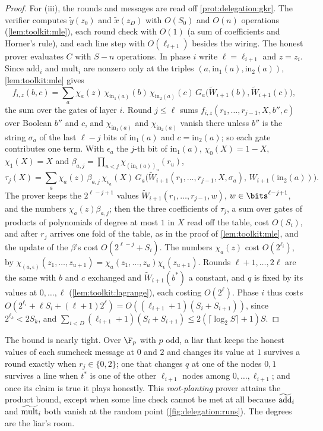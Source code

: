 \begin{refsection}
\begin{proof}
For (iii), the rounds and messages are read off \cref{prot:delegation:gkr}. The verifier computes $\tilde y(z_0)$ and $\tilde x(z_D)$ with $O(S_0)$ and $O(n)$ operations (\cref{lem:toolkit:mle}), each round check with $O(1)$ (a sum of coefficients and Horner's rule), and each line step with $O(\ell_{i+1})$ besides the wiring. The honest prover evaluates $C$ with $S-n$ operations. In phase $i$ write $\ell=\ell_{i+1}$ and $z=z_i$. Since $\mathrm{add}_i$ and $\mathrm{mult}_i$ are nonzero only at the triples $(a,\mathrm{in}_1(a),\mathrm{in}_2(a))$, \cref{lem:toolkit:mle} gives
\[
f_{i,z}(b,c)=\sum_a\chi_a(z)\,\chi_{\mathrm{in}_1(a)}(b)\,\chi_{\mathrm{in}_2(a)}(c)\,G_a\bigl(\tilde W_{i+1}(b),\tilde W_{i+1}(c)\bigr),
\]
the sum over the gates of layer $i$. Round $j\le\ell$ sums $f_{i,z}(r_1,\dots,r_{j-1},X,b'',c)$ over Boolean $b''$ and $c$, and $\chi_{\mathrm{in}_1(a)}$ and $\chi_{\mathrm{in}_2(a)}$ vanish there unless $b''$ is the string $\sigma_a$ of the last $\ell-j$ bits of $\mathrm{in}_1(a)$ and $c=\mathrm{in}_2(a)$; so each gate contributes one term. With $\epsilon_a$ the $j$-th bit of $\mathrm{in}_1(a)$, $\chi_0(X)=1-X$, $\chi_1(X)=X$ and $\beta_{a,j}=\prod_{u<j}\chi_{(\mathrm{in}_1(a))_u}(r_u)$,
\[
\tau_j(X)=\sum_a\chi_a(z)\,\beta_{a,j}\,\chi_{\epsilon_a}(X)\,G_a\bigl(\tilde W_{i+1}(r_1,\dots,r_{j-1},X,\sigma_a),\,W_{i+1}(\mathrm{in}_2(a))\bigr).
\]
The prover keeps the $2^{\ell-j+1}$ values $\tilde W_{i+1}(r_1,\dots,r_{j-1},w)$, $w\in\bits^{\ell-j+1}$, and the numbers $\chi_a(z)\beta_{a,j}$; then the three coefficients of $\tau_j$, a sum over gates of products of polynomials of degree at most $1$ in $X$ read off the table, cost $O(S_i)$, and after $r_j$ arrives one fold of the table, as in the proof of \cref{lem:toolkit:mle}, and the update of the $\beta$'s cost $O(2^{\ell-j}+S_i)$. The numbers $\chi_a(z)$ cost $O(2^{\ell_i})$, by $\chi_{(a,\epsilon)}(z_1,\dots,z_{u+1})=\chi_a(z_1,\dots,z_u)\chi_\epsilon(z_{u+1})$. Rounds $\ell+1,\dots,2\ell$ are the same with $b$ and $c$ exchanged and $\tilde W_{i+1}(b^*)$ a constant, and $q$ is fixed by its values at $0,\dots,\ell$ (\cref{lem:toolkit:lagrange}), each costing $O(2^\ell)$. Phase $i$ thus costs $O(2^{\ell_i}+\ell S_i+(\ell+1)2^\ell)=O((\ell_{i+1}+1)(S_i+S_{i+1}))$, since $2^{\ell_k}<2S_k$, and $\sum_{i<D}(\ell_{i+1}+1)(S_i+S_{i+1})\le2(\lceil\log_2S\rceil+1)S$.
\end{proof}

The bound is nearly tight. Over $\F_p$ with $p$ odd, a liar that keeps the honest values of each sumcheck message at $0$ and $2$ and changes its value at $1$ survives a round exactly when $r_j\in\{0,2\}$; one that changes $q$ at one of the nodes $0,1$ survives a line when $t^*$ is one of the other $\ell_{i+1}$ nodes among $0,\dots,\ell_{i+1}$; and once its claim is true it plays honestly. This \emph{root-planting} prover attains the product bound, except when some line check cannot be met at all because $\widetilde{\mathrm{add}}_i$ and $\widetilde{\mathrm{mult}}_i$ both vanish at the random point (\cref{fig:delegation:runs}). The degrees are the liar's room.


\end{refsection}
